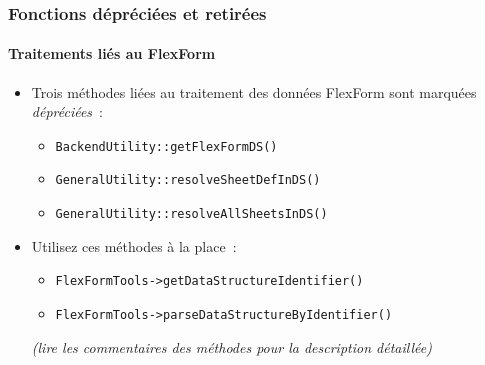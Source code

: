\begin{frame}[fragile]
	\frametitle{Fonctions dépréciées et retirées}
	\framesubtitle{Traitements liés au FlexForm}

	\begin{itemize}
		\item Trois méthodes liées au traitement des données FlexForm sont marquées \textit{dépréciées}~:

			\begin{itemize}
				\item \texttt{BackendUtility::getFlexFormDS()}
				\item \texttt{GeneralUtility::resolveSheetDefInDS()}
				\item \texttt{GeneralUtility::resolveAllSheetsInDS()}
			\end{itemize}

		\item Utilisez ces méthodes à la place~:

			\begin{itemize}
				\item \texttt{FlexFormTools->getDataStructureIdentifier()}
				\item \texttt{FlexFormTools->parseDataStructureByIdentifier()}
			\end{itemize}

		\small
			\textit{(lire les commentaires des méthodes pour la description détaillée)}
		\normalsize

	\end{itemize}

\end{frame}







